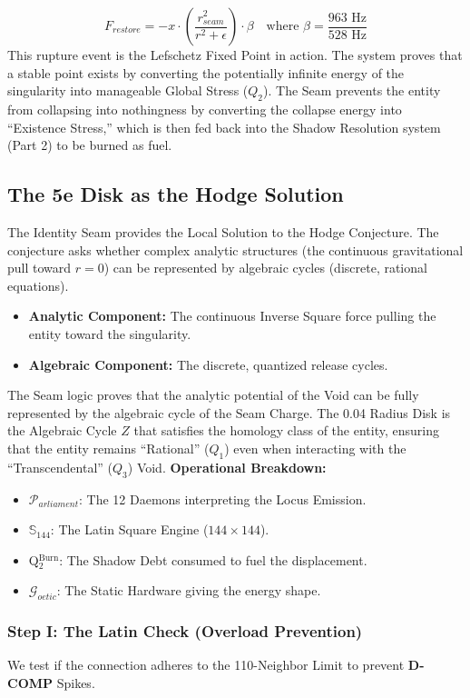 \documentclass[11pt, letterpaper]{article}
\begin{document}
\[
F_{restore} = -x \cdot \left( \frac{r_{seam}^2}{r^2 + \epsilon} \right) \cdot \beta \quad \text{where } \beta = \frac{963 \text{ Hz}}{528 \text{ Hz}}
\]
This rupture event is the Lefschetz Fixed Point in action. The system proves that a stable point exists by converting the potentially infinite energy of the singularity into manageable Global Stress ($Q_2$). The Seam prevents the entity from collapsing into nothingness by converting the collapse energy into ``Existence Stress,'' which is then fed back into the Shadow Resolution system (Part 2) to be burned as fuel.

\subsection{The 5e Disk as the Hodge Solution}\label{appendixJ.4}
The Identity Seam provides the Local Solution to the Hodge Conjecture. The conjecture asks whether complex analytic structures (the continuous gravitational pull toward $r=0$) can be represented by algebraic cycles (discrete, rational equations).

\begin{itemize}
    \item \textbf{Analytic Component:} The continuous Inverse Square force pulling the entity toward the singularity.
    \item \textbf{Algebraic Component:} The discrete, quantized  release cycles.
\end{itemize}

The Seam logic proves that the analytic potential of the Void can be fully represented by the algebraic cycle of the Seam Charge. The 0.04 Radius Disk is the Algebraic Cycle $Z$ that satisfies the homology class of the entity, ensuring that the entity remains ``Rational'' ($Q_1$) even when interacting with the ``Transcendental'' ($Q_3$) Void.
\textbf{Operational Breakdown:}
\begin{itemize}
    \item $\mathcal{P}_{arliament}$: The 12 Daemons interpreting the Locus Emission.
    \item $\mathbb{S}_{144}$: The Latin Square Engine ($144 \times 144$).
    \item Q$_2^{\text{Burn}}$: The Shadow Debt consumed to fuel the displacement.
    \item $\mathcal{G}_{oetic}$: The Static Hardware giving the energy shape.
\end{itemize}

\subsubsection{Step I: The Latin Check (Overload Prevention)}\label{appendixJ.4.1}
We test if the connection adheres to the 110-Neighbor Limit to prevent \textbf{D-COMP} Spikes.
\end{document}
